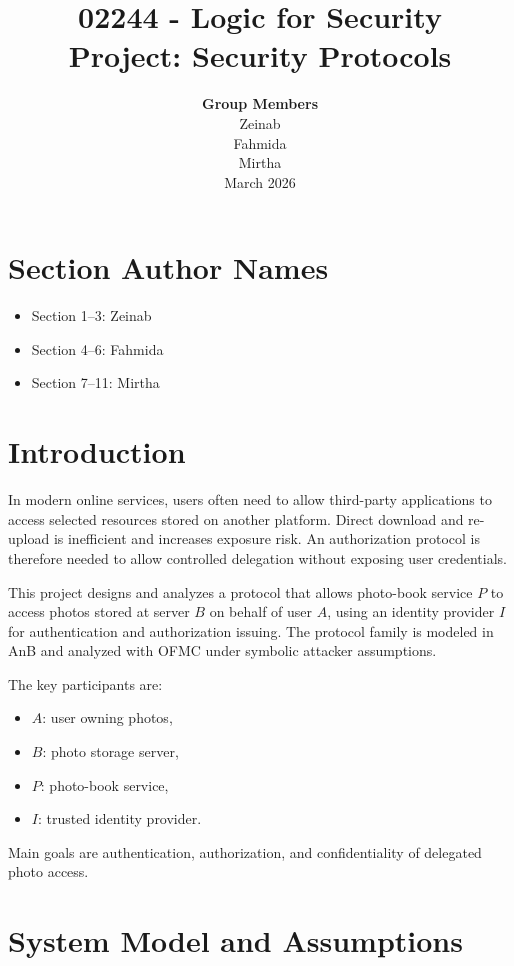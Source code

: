 \documentclass[11pt,a4paper]{article}
\title{02244 - Logic for Security\\
\vspace{0.5em}
Project: Security Protocols}
\author{%
  \textbf{Group Members}\\[0.4em]
  Zeinab\\
  Fahmida\\
  Mirtha\\[0.8em]
  March 2026
}
\date{}
\begin{document}
\maketitle
\thispagestyle{empty}

\newpage
\tableofcontents
\newpage

\section*{Section Author Names}
\begin{itemize}
  \item Section 1--3: Zeinab
  \item Section 4--6: Fahmida
  \item Section 7--11: Mirtha
\end{itemize}

\newpage
\section{Introduction}

In modern online services, users often need to allow third-party applications to access selected resources stored on another platform.
Direct download and re-upload is inefficient and increases exposure risk.
An authorization protocol is therefore needed to allow controlled delegation without exposing user credentials.

This project designs and analyzes a protocol that allows photo-book service $P$ to access photos stored at server $B$ on behalf of user $A$, using an identity provider $I$ for authentication and authorization issuing.
The protocol family is modeled in AnB and analyzed with OFMC under symbolic attacker assumptions.

The key participants are:
\begin{itemize}
  \item $A$: user owning photos,
  \item $B$: photo storage server,
  \item $P$: photo-book service,
  \item $I$: trusted identity provider.
\end{itemize}

Main goals are authentication, authorization, and confidentiality of delegated photo access.

\section{System Model and Assumptions}
\end{document}
